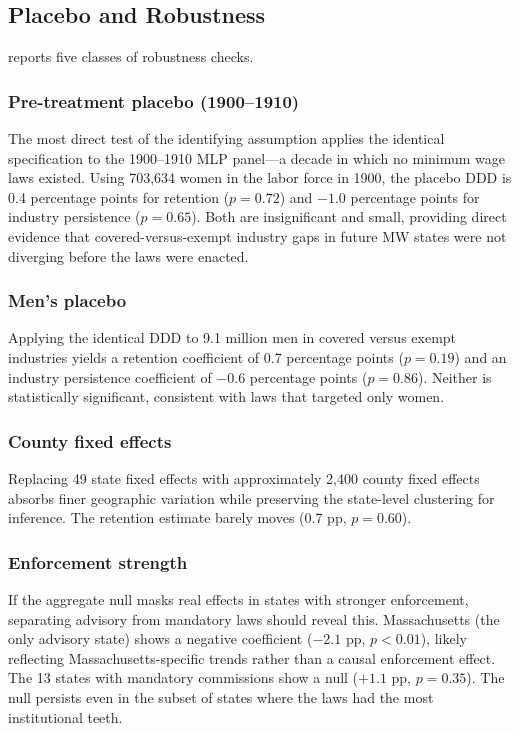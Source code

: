 \documentclass[12pt]{article}
\begin{document}


\subsection{Placebo and Robustness}

 reports five classes of robustness checks.

\subsubsection*{Pre-treatment placebo (1900--1910)} The most direct test of the identifying assumption applies the identical specification to the 1900--1910 MLP panel---a decade in which no minimum wage laws existed. Using 703,634 women in the labor force in 1900, the placebo DDD is 0.4 percentage points for retention ($p = 0.72$) and $-1.0$ percentage points for industry persistence ($p = 0.65$). Both are insignificant and small, providing direct evidence that covered-versus-exempt industry gaps in future MW states were not diverging before the laws were enacted.

\subsubsection*{Men's placebo} Applying the identical DDD to 9.1 million men in covered versus exempt industries yields a retention coefficient of 0.7 percentage points ($p = 0.19$) and an industry persistence coefficient of $-0.6$ percentage points ($p = 0.86$). Neither is statistically significant, consistent with laws that targeted only women.

\subsubsection*{County fixed effects} Replacing 49 state fixed effects with approximately 2,400 county fixed effects absorbs finer geographic variation while preserving the state-level clustering for inference. The retention estimate barely moves (0.7 pp, $p = 0.60$).

\subsubsection*{Enforcement strength} If the aggregate null masks real effects in states with stronger enforcement, separating advisory from mandatory laws should reveal this. Massachusetts (the only advisory state) shows a negative coefficient ($-2.1$ pp, $p < 0.01$), likely reflecting Massachusetts-specific trends rather than a causal enforcement effect. The 13 states with mandatory commissions show a null ($+1.1$ pp, $p = 0.35$). The null persists even in the subset of states where the laws had the most institutional teeth.
\end{document}
